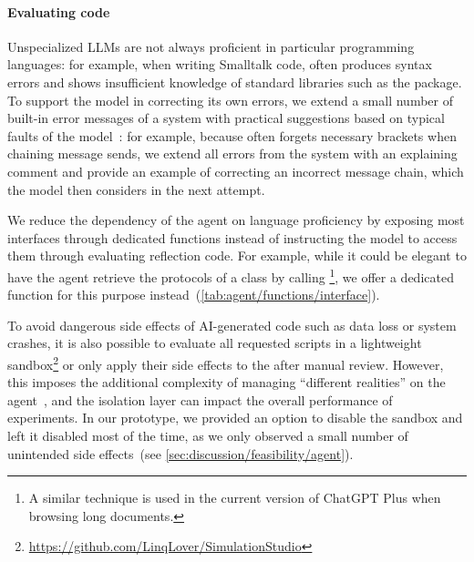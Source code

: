\paragraph{Evaluating code}
Unspecialized LLMs are not always proficient in particular programming languages:
for example, when writing Smalltalk code, \gptfouro often produces syntax errors and shows insufficient knowledge of standard libraries such as the  package.
To support the model in correcting its own errors, we extend a small number of built-in error messages of a system with practical suggestions based on typical faults of the model~\cite{traver2010compiler}:
for example, because \gptfouro often forgets necessary brackets when chaining message sends, we extend all  errors from the system with an explaining comment and provide an example of correcting an incorrect message chain, which the model then considers in the next attempt.

We reduce the dependency of the agent on language proficiency by exposing most interfaces through dedicated functions instead of instructing the model to access them through evaluating reflection code.
For example, while it could be elegant to have the agent retrieve the protocols of a class by calling \footnote{A similar technique is used in the current version of ChatGPT Plus when browsing long documents.}, we offer a dedicated  function for this purpose instead~(\cref{tab:agent/functions/interface}).

To avoid dangerous side effects of AI-generated code such as data loss or system crashes, it is also possible to evaluate all requested scripts in a lightweight sandbox\footnote{\url{https://github.com/LinqLover/SimulationStudio}} or only apply their side effects to the after manual review.
However, this imposes the additional complexity of managing ``different realities'' on the agent~\cite{rehwaldt2012exploring}, and the isolation layer can impact the overall performance of experiments.
In our prototype, we provided an option to disable the sandbox and left it disabled most of the time, as we only observed a small number of unintended side effects~(see \cref{sec:discussion/feasibility/agent}).
